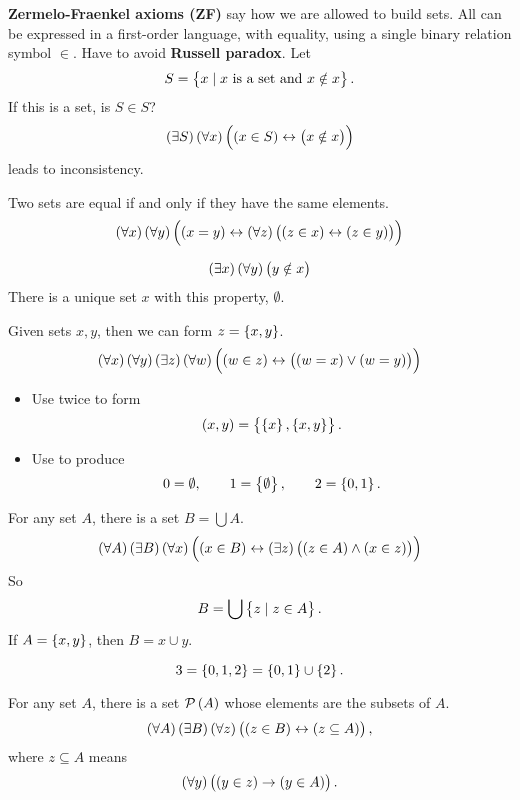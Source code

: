 \textbf{Zermelo-Fraenkel axioms (ZF)} say how we are allowed to build sets. All can be expressed in a first-order language, with equality, using a single binary relation symbol $ \in $. Have to avoid \textbf{Russell paradox}. Let
$$ S = \cbr{x \mid x \ \text{is a set and} \ x \notin x}. $$
If this is a set, is $ S \in S $?
$$ \teb{S}\fab{x}\iffb{\inb{x}{S}}{\nib{x}{x}} $$
leads to inconsistency.

\begin{axiom}
Two sets are equal if and only if they have the same elements.
$$ \fab{x}\fab{y}\iffb{\eqb{x}{y}}{\fab{z}\iffb{\inb{z}{x}}{\inb{z}{y}}} $$
\end{axiom}

\begin{axiom}
$$ \teb{x}\fab{y}\nib{y}{x} $$
There is a unique set $ x $ with this property, $ \emptyset $.
\end{axiom}


\begin{axiom}
Given sets $ x, y $, then we can form $ z = \cbr{x, y} $.
$$ \fab{x}\fab{y}\teb{z}\fab{w}\iffb{\inb{w}{z}}{\orb{\eqb{w}{x}}{\eqb{w}{y}}} $$
\end{axiom}

\begin{remark*}
\hfill
\begin{itemize}
\item Use twice to form
$$ \br{x, y} = \cbr{\cbr{x}, \cbr{x, y}}. $$
\item Use to produce
$$ 0 = \emptyset, \qquad 1 = \cbr{\emptyset}, \qquad 2 = \cbr{0, 1}. $$
\end{itemize}
\end{remark*}

\begin{axiom}
For any set $ A $, there is a set $ B = \bigcup A $.
$$ \fab{A}\teb{B}\fab{x}\iffb{\inb{x}{B}}{\teb{z}\andb{\inb{z}{A}}{\inb{x}{z}}} $$
So
$$ B = \bigcup \cbr{z \mid z \in A}. $$
If $ A = \cbr{x, y} $, then $ B = x \cup y $.
\end{axiom}

\begin{example*}
$$ 3 = \cbr{0, 1, 2} = \cbr{0, 1} \cup \cbr{2}. $$
\end{example*}

\begin{axiom}
For any set $ A $, there is a set $ \PP\br{A} $ whose elements are the subsets of $ A $.
$$ \fab{A}\teb{B}\fab{z}\iffb{\inb{z}{B}}{\subb{z}{A}}, $$
where $ z \subseteq A $ means
$$ \fab{y}\impb{\inb{y}{z}}{\inb{y}{A}}. $$
\end{axiom}

